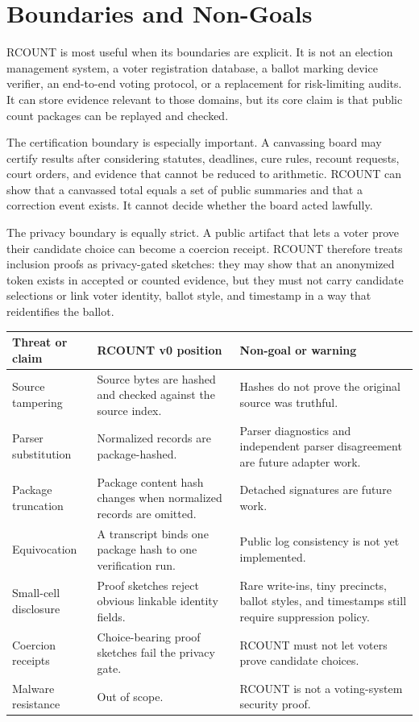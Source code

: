 \section{Boundaries and Non-Goals}

RCOUNT is most useful when its boundaries are explicit. It is not an election
management system, a voter registration database, a ballot marking device
verifier, an end-to-end voting protocol, or a replacement for risk-limiting
audits. It can store evidence relevant to those domains, but its core claim is
that public count packages can be replayed and checked.

The certification boundary is especially important. A canvassing board may
certify results after considering statutes, deadlines, cure rules, recount
requests, court orders, and evidence that cannot be reduced to arithmetic. RCOUNT
can show that a canvassed total equals a set of public summaries and that a
correction event exists. It cannot decide whether the board acted lawfully.

The privacy boundary is equally strict. A public artifact that lets a voter
prove their candidate choice can become a coercion receipt. RCOUNT therefore
treats inclusion proofs as privacy-gated sketches: they may show that an
anonymized token exists in accepted or counted evidence, but they must not carry
candidate selections or link voter identity, ballot style, and timestamp in a
way that reidentifies the ballot.

\begin{center}
\small
\begin{tabularx}{\textwidth}{lXX}
\toprule
Threat or claim & RCOUNT v0 position & Non-goal or warning \\
\midrule
Source tampering & Source bytes are hashed and checked against the source index. & Hashes do not prove the original source was truthful. \\
Parser substitution & Normalized records are package-hashed. & Parser diagnostics and independent parser disagreement are future adapter work. \\
Package truncation & Package content hash changes when normalized records are omitted. & Detached signatures are future work. \\
Equivocation & A transcript binds one package hash to one verification run. & Public log consistency is not yet implemented. \\
Small-cell disclosure & Proof sketches reject obvious linkable identity fields. & Rare write-ins, tiny precincts, ballot styles, and timestamps still require suppression policy. \\
Coercion receipts & Choice-bearing proof sketches fail the privacy gate. & RCOUNT must not let voters prove candidate choices. \\
Malware resistance & Out of scope. & RCOUNT is not a voting-system security proof. \\
\bottomrule
\end{tabularx}
\end{center}

